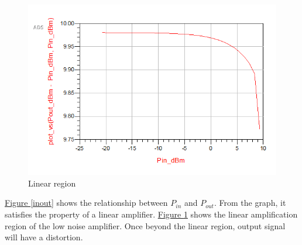 \documentclass[12pt,a4paper]{report}
\begin{document}
\begin{figure}[H]
    \centerline{\includegraphics{P_inP_outSlope.PNG}}
    \caption{Linear region}
    \label{linearregion}
\end{figure}
\hyperref[inout]{Figure \ref*{inout}} shows the relationship between $P_{in}$ and $P_{out}$. From the graph, it satisfies the property of a linear amplifier. \hyperref[linearregion]{Figure \ref*{linearregion}} shows the 
linear amplification region of the low noise amplifier. Once beyond the linear region, output signal will have a distortion.
\end{document}
